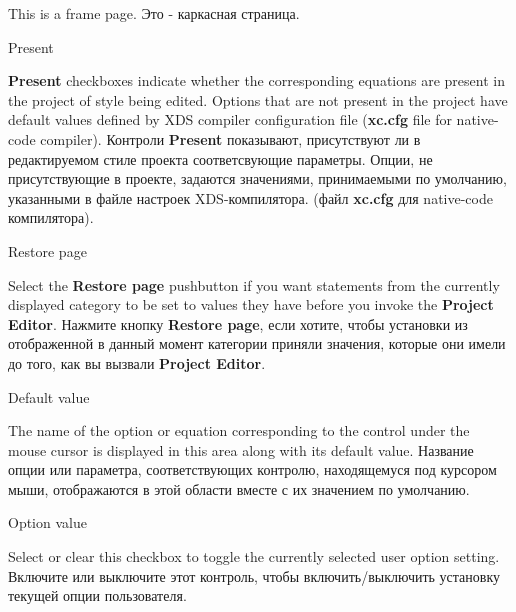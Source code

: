 \begin{popup}
\ifenglish
This is a frame page.
\else
Это - каркасная страница.
\fi
\end{popup}


\begin{popup}
\caption{Present}
\ifenglish
{\bf Present} checkboxes indicate whether the corresponding equations
are present in the project of style being edited.
Options that are not present in the project have default values defined by
XDS compiler configuration file ({\bf xc.cfg} file for native-code compiler).
\else
Контроли {\bf Present} показывают, присутствуют ли в редактируемом стиле 
проекта соответсвующие параметры.
Опции, не присутствующие в проекте, задаются значениями, принимаемыми по 
умолчанию, указанными в файле настроек XDS-компилятора. 
(файл {\bf xc.cfg} для native-code компилятора).
\fi
\end{popup}

\begin{popup}
\caption{Restore page}

\ifenglish
Select the {\bf Restore page} pushbutton if you want statements from
the currently displayed category to be set to values they have before
you invoke the {\bf Project Editor}.
\else
Нажмите кнопку {\bf Restore page}, если хотите, чтобы установки из отображенной 
в данный момент категории приняли значения, которые они имели до того, как вы 
вызвали {\bf Project Editor}.
\fi
\end{popup}

\begin{popup}
\caption{Default value}

\ifenglish
The name of the option or equation corresponding to the control under
the mouse cursor is displayed in this area along with its default value.
\else
Название опции или параметра, соответствующих контролю, находящемуся под 
курсором мыши, отображаются в этой области вместе с их значением по умолчанию.
\fi
\end{popup}

\begin{popup}
\caption{Option value}

\ifenglish
Select or clear this checkbox to toggle the currently selected user option
setting.
\else
Включите или выключите этот контроль, чтобы включить/выключить установку 
текущей опции пользователя.
\fi
\end{popup}

